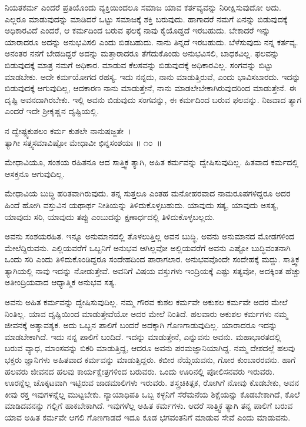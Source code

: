 ನಿಯತಕರ್ಮ ಎಂದರೆ ಪ್ರತಿಯೊಂದು ವ್ಯಕ್ತಿಯಿಂದಲೂ ಸಮಾಜ ಯಾವ ಕರ್ತವ್ಯವನ್ನು ನಿರೀಕ್ಷಿಸುವುದೋ ಅದು. ಎಲ್ಲರೂ ಮಾಡುವುದನ್ನು ಮಾಡಿದರೆ ಒಟ್ಟು ಸಮಾಜಕ್ಕೆ ಶಕ್ತಿ ಬರುವುದು. ಹಾಗಾದರೆ ನಮಗೆ ಏನನ್ನು ಬಿಡುವುದಕ್ಕೆ ಅಧಿಕಾರವಿದೆ ಎಂದರೆ, ಆ ಕರ್ಮದಿಂದ ಬರುವ ಫಲಕ್ಕೆ ನಾವು ಕೈಯೊಡ್ಡದೆ ಇರಬಹುದು. ಬೇಕಾದರೆ ಇನ್ನು ಯಾರಾದರೂ ಅದನ್ನು ಅನುಭವಿಸಲಿ ಎಂದು ಬಿಡಬಹುದು. ನಾನು ತಿನ್ನದೆ ಇರಬಹುದು. ಬೆಳೆಸುವುದು ನನ್ನ ಕರ್ತವ್ಯ. ಅನಂತರ ನನಗೆ ಬೇಡದಿದ್ದರೆ ಅದನ್ನು ಮತ್ತಾರಾದರೂ ತೆಗೆದುಕೊಂಡು ಅನುಭವಿಸಲಿ, ಬಾಧಕವಿಲ್ಲ. ಫಲವನ್ನು ಬಿಡುವುದಕ್ಕೆ ಮಾತ್ರ ನಮಗೆ ಅಧಿಕಾರ. ಮಾಡುವ ಕೆಲಸವನ್ನು ಬಿಡುವುದಕ್ಕೆ ಅಧಿಕಾರವಿಲ್ಲ. ಸಂಗವನ್ನು ಬಿಟ್ಟು ಮಾಡಬೇಕು. ಅದೇ ಕರ್ಮಯೋಗದ ರಹಸ್ಯ. ಇದು ನನ್ನದು, ನಾನು ಮಾಡುತ್ತಿರುವೆ, ಎಂದು ಭಾವಿಸಬಾರದು. ಇದನ್ನು ಬಿಡುವುದಕ್ಕೆ ಆಗುವುದಿಲ್ಲ, ಆದಕಾರಣ ನಾನು ಮಾಡುತ್ತೇನೆ, ನಾನು ಮಾಡಲೇಬೇಕಾಗಿರುವುದರಿಂದ ಮಾಡುತ್ತೇನೆ. ಈ ದೃಷ್ಟಿ ಅವನದಾಗಿರಬೇಕು. ಇಲ್ಲಿ ಅವನು ಬಿಡುವುದು ಸಂಗವನ್ನು, ಈ ಕರ್ಮದಿಂದ ಬರುವ ಫಲವನ್ನು. ನಿಜವಾದ ತ್ಯಾಗ ಎಂದರೆ ಇದೇ ಶ‍್ರೀಕೃಷ್ಣನ ದೃಷ್ಟಿಯಲ್ಲಿ. 

\begin{shloka}
ನ ದ್ವೇಷ್ಟ್ಯಕುಶಲಂ ಕರ್ಮ ಕುಶಲೇ ನಾನುಷಜ್ಜತೇ~।\\ತ್ಯಾಗೀ ಸತ್ತ್ವಸಮಾವಿಷ್ಟೋ ಮೇಧಾವೀ ಛಿನ್ನಸಂಶಯಃ \hfill॥ ೧೦~॥
\end{shloka}

\begin{artha}
ಮೇಧಾವಿಯೂ, ಸಂಶಯ ರಹಿತನೂ ಆದ ಸಾತ್ತ್ವಿಕ ತ್ಯಾಗಿ, ಅಹಿತ ಕರ್ಮವನ್ನು ದ್ವೇಷಿಸುವುದಿಲ್ಲ. ಹಿತವಾದ ಕರ್ಮದಲ್ಲಿ ಆಸಕ್ತನೂ ಆಗುವುದಿಲ್ಲ.
\end{artha}

ಮೇಧಾವಿಯ ಬುದ್ಧಿ ಹರಿತವಾಗಿರುವುದು. ತನ್ನ ಸುತ್ತಲೂ ಎಂತಹ ಮನೋಹರವಾದ ನಾಮರೂಪಗಳಿದ್ದರೂ ಅದರ ಹಿಂದೆ ಹೋಗಿ ವಸ್ತುವಿನ ಯಥಾರ್ಥ ನೀತಿಯನ್ನು ತಿಳಿದುಕೊಳ್ಳಬಹುದು. ಯಾವುದು ಸತ್ಯ, ಯಾವುದು ಅಸತ್ಯ, ಯಾವುದು ಸರಿ, ಯಾವುದು ತಪ್ಪು ಎಂಬುದನ್ನು ಕ್ಷಣಾರ್ಧದಲ್ಲಿ ತಿಳಿದುಕೊಳ್ಳಬಲ್ಲದು.

\newpage

ಅವನು ಸಂಶಯರಹಿತ. ಇನ್ನೂ ಅನುಮಾನದಲ್ಲಿ ತೊಳಲುತ್ತಿಲ್ಲ ಅವನ ಬುದ್ಧಿ. ಅವನು ಅನುಮಾನದ ಮೋಡಗಳಿಂದ ಮೇಲೆದ್ದಿರುವನು. ಎಲ್ಲಿಯವರೆಗೆ ಒಬ್ಬನಿಗೆ ಅನುಭವ ಆಗಿಲ್ಲವೋ ಅಲ್ಲಿಯವರೆಗೆ ಅವನು ಎಷ್ಟೋ ಬುದ್ಧಿವಂತನಾಗಿ ಒಂದು ಸರಿ ಎಂದು ತಿಳಿದುಕೊಂಡಿದ್ದರೂ ಸಂದೇಹದಿಂದ ಪಾರಾಗಲಾರ. ಅನುಭವವೊಂದೇ ಸಂದೇಹಕ್ಕೆ ಮದ್ದು. ಸಾತ್ತ್ವಿಕ ತ್ಯಾಗಿಯಲ್ಲಿ ನಾವು ಇದನ್ನು ನೋಡುತ್ತೇವೆ. ಅವನಿಗೆ ವಿಷಯ ವಸ್ತುಗಳು ಇಂದ್ರಿಯಕ್ಕೆ ಎಷ್ಟು ಸತ್ಯವೋ, ಅದಕ್ಕಿಂತ ಹೆಚ್ಚು ಅತೀಂದ್ರಿಯವಾದ ಆಧ್ಯಾತ್ಮಿಕ ಅನುಭವ ಸತ್ಯ.

ಅವನು ಅಹಿತ ಕರ್ಮವನ್ನು ದ್ವೇಷಿಸುವುದಿಲ್ಲ. ನಮ್ಮ ಗೌರವ ಕುಶಲ ಕರ್ಮವೇ ಅಕುಶಲ ಕರ್ಮವೇ ಅದರ ಮೇಲೆ ನಿಂತಿಲ್ಲ. ಯಾವ ದೃಷ್ಟಿಯಿಂದ ಮಾಡುತ್ತೇವೆಯೋ ಅದರ ಮೇಲೆ ನಿಂತಿದೆ. ಹಲವಾರು ಅಕುಶಲ ಕರ್ಮಗಳು ನಮ್ಮ ಜೀವನಕ್ಕೆ ಅತ್ಯಾವಶ್ಯಕ. ಅದು ಒಬ್ಬನ ಪಾಲಿಗೆ ಬಂದರೆ ಅದಕ್ಕಾಗಿ ಗೊಣಗಾಡುವುದಿಲ್ಲ. ಯಾರಾದರೂ ಇದನ್ನು ಮಾಡಬೇಕಾಗಿದೆ. ಇದು ನನ್ನ ಪಾಲಿಗೆ ಬಂದಿದೆ. ಇದನ್ನು ಮಾಡುತ್ತೇನೆ, ಎನ್ನುವನು ಅವನು. ಮಹಾಭಾರತದಲ್ಲಿ ಬರುವ ವ್ಯಾಧ, ಮಾಂಸವನ್ನು ಬಿಕರಿ ಮಾಡುತ್ತಿದ್ದ, ಆದರೂ ಅವನು ಪರಮಜ್ಞಾನಿಯಾಗಿದ್ದ. ನಮ್ಮ ದೇಶದಲ್ಲೆ ಹಲವು ಭಕ್ತರು ಜ್ಞಾನಿಗಳು ಅಹಿತವಾದ ಕರ್ಮವನ್ನು ಮಾಡುತ್ತಿದ್ದರು. ಕಬೀರ ನೆಯ್ಗೆಯವನು, ಗೋರ ಕುಂಬಾರರವನು. ಹಾಗೆ ಹಲವರು ಜೀವನದ ಹಲವು ಕಾರ್ಯಕ್ಷೇತ್ರಗಳಿಂದ ಬರುವರು. ಒಂದು ಊರಿನಲ್ಲಿ ಪೋಲಿಸನವರು ಇರುವರು. ಊರನ್ನೆಲ್ಲ ಚೊಕ್ಕಟವಾಗಿ ಇಟ್ಟಿರುವ ಜಾಡಮಾಲಿಗಳು ಇರುವರು. ಶಸ್ತ್ರಚಿಕಿತ್ಸಕ, ರೋಗಿಗೆ ನೋವು ಕೊಡಬೇಕು, ಅವನ ಕೀವು ರಕ್ತ ಇವುಗಳನ್ನೆಲ್ಲ ಮುಟ್ಟಬೇಕು. ನ್ಯಾಯಾಧಿಪತಿ ಒಬ್ಬ ಕಳ್ಳನಿಗೆ ಸೆರೆಮನೆಯ ಶಿಕ್ಷೆಯನ್ನು ಕೊಡಬೇಕಾಗಿದೆ, ಕೊಲೆ ಮಾಡಿದವನನ್ನು ಗಲ್ಲಿಗೆ ಹಾಕಬೇಕಾಗಿದೆ. ಇವುಗಳೆಲ್ಲ ಅಹಿತ ಕರ್ಮಗಳು. ಆದರೆ ಸಾತ್ತ್ವಿಕ ತ್ಯಾಗಿ ತನ್ನ ಪಾಲಿಗೆ ಬರುವ ಯಾವ ಅಹಿತ ಕರ್ಮವೇ ಆಗಲಿ ಗೊಣಗಾಡದೆ ಇದೂ ಕೂಡ ಭಗವಂತನಿಗೆ ಮಾಡುವ ಸೇವೆ ಎಂದು ಮಾಡುವನು.

